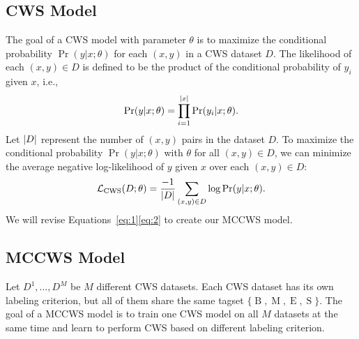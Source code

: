 \documentclass[11pt]{article}
\newcommand{\set}[1]{\lbrace #1 \rbrace}
\newcommand{\loss}{\mathcal{L}}
\newcommand{\BTag}{\operatorname{B}}
\newcommand{\MTag}{\operatorname{M}}
\newcommand{\ETag}{\operatorname{E}}
\newcommand{\STag}{\operatorname{S}}
\newcommand{\TagSet}{\set{\BTag, \MTag, \ETag, \STag}}
\newcommand{\opCWS}{\operatorname{CWS}}
\DeclarePairedDelimiter{\abs}{\lvert}{\rvert}
\begin{document}

\subsection{CWS Model}\label{sec:cws}

The goal of a CWS model with parameter \(\theta\) is to maximize the conditional probability \(\Pr(y | x ; \theta)\) for each \((x, y)\) in a CWS dataset \(D\).
The likelihood of each \((x, y) \in D\) is defined to be the product of the conditional probability of \(y_i\) given \(x\), i.e.,
\begin{equation}\label{eq:1}
  \Pr(y | x ; \theta) = \prod_{i = 1}^{\abs{x}} \Pr(y_i | x ; \theta).
\end{equation}
Let \(\abs{D}\) represent the number of \((x, y)\) pairs in the dataset \(D\).
To maximize the conditional probability \(\Pr(y | x ; \theta)\) with \(\theta\) for all \((x, y) \in D\), we can minimize the average negative log-likelihood of \(y\) given \(x\) over each \((x, y) \in D\):
\begin{equation}\label{eq:2}
  \loss_{\opCWS}(D ; \theta) = \dfrac{-1}{\abs{D}} \sum_{(x, y) \in D} \log \Pr(y|x ; \theta).
\end{equation}
We will revise Equations~\eqref{eq:1}\eqref{eq:2} to create our MCCWS model.

\subsection{MCCWS Model}\label{sec:mccws}

Let \(D^1, \dots, D^M\) be \(M\) different CWS datasets.
Each CWS dataset has its own labeling criterion, but all of them share the same tagset \(\TagSet\).
The goal of a MCCWS model is to train one CWS model on all \(M\) datasets at the same time and learn to perform CWS based on different labeling criterion.
\end{document}

